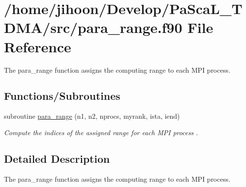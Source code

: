 \hypertarget{para__range_8f90}{}\section{/home/jihoon/\+Develop/\+Pa\+Sca\+L\+\_\+\+T\+D\+M\+A/src/para\+\_\+range.f90 File Reference}
\label{para__range_8f90}


The para\+\_\+range function assigns the computing range to each M\+PI process.  


\subsection*{Functions/\+Subroutines}
\begin{DoxyCompactItemize}
\item 
subroutine \hyperlink{para__range_8f90_ab75ab386311975aa4ff7cac06798fcd4}{para\+\_\+range} (n1, n2, nprocs, myrank, ista, iend)
\begin{DoxyCompactList}\small\item\em Compute the indices of the assigned range for each M\+PI process . \end{DoxyCompactList}\end{DoxyCompactItemize}


\subsection{Detailed Description}
The para\+\_\+range function assigns the computing range to each M\+PI process. 

